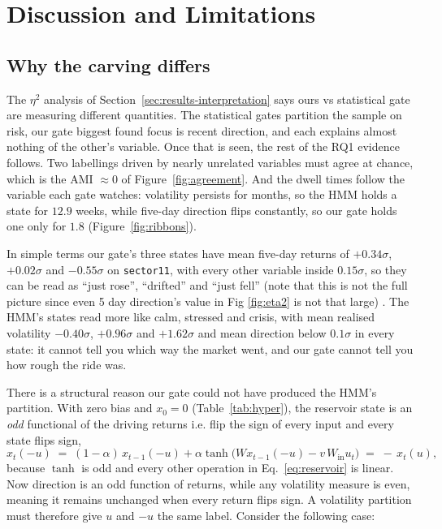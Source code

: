 
\chapter{Discussion and Limitations}
\label{ch:discussion}

\section{Why the carving differs}
\label{sec:disc-carving}

The $\eta^2$ analysis of Section~\ref{sec:results-interpretation} says ours vs statistical gate are measuring different quantities. The statistical gates partition the sample on risk, our gate biggest found focus is recent direction, and each explains almost nothing of the other's variable. Once that is seen, the rest of the RQ1 evidence follows. Two labellings driven by nearly unrelated variables must agree at chance, which is the AMI $\approx 0$ of Figure~\ref{fig:agreement}. And the dwell times follow the variable each gate watches: volatility persists for months, so the HMM holds a state for $12.9$ weeks, while five-day direction flips constantly, so our gate holds one only for $1.8$ (Figure~\ref{fig:ribbons}).

In simple terms our gate's three states have mean five-day returns of $+0.34\sigma$, $+0.02\sigma$ and $-0.55\sigma$ on \texttt{sector11}, with every other variable inside $0.15\sigma$, so they can be read as ``just rose'', ``drifted'' and ``just fell'' (note that this is not the full picture since even 5 day direction's value in Fig \ref{fig:eta2} is not that large) . The HMM's states read more like calm, stressed and crisis, with mean realised volatility $-0.40\sigma$, $+0.96\sigma$ and $+1.62\sigma$ and mean direction below $0.1\sigma$ in every state: it cannot tell you which way the market went, and our gate cannot tell you how rough the ride was.

There is a structural reason our gate could not have produced the HMM's partition. With zero bias and $x_0 = 0$ (Table~\ref{tab:hyper}), the reservoir state is an \emph{odd} functional of the driving returns i.e. flip the sign of every input and every state flips sign,
\begin{equation}
  x_t(-u) \;=\; (1-\alpha)\,x_{t-1}(-u)
  + \alpha\tanh\!\big(W x_{t-1}(-u) - v\,W_{\text{in}} u_t\big)
  \;=\; -\,x_t(u),
  \label{eq:odd-state}
\end{equation}
because $\tanh$ is odd and every other operation in Eq.~\ref{eq:reservoir} is linear. Now direction is an odd function of returns, while any volatility measure is even, meaning it remains unchanged when every return flips sign. A volatility partition must therefore give $u$ and $-u$ the same label. Consider the following case:

